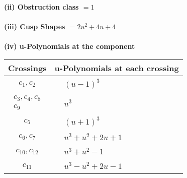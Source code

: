 \documentclass[1p]{elsarticle_modified}
\theoremstyle{definition}
\begin{document}
\flushleft \textbf{(ii) Obstruction class $= 1$}\\~\\
\flushleft \textbf{(iii) Cusp Shapes $= 2 u^2+4 u+4$}\\~\\
\newpage\renewcommand{\arraystretch}{1}
\flushleft \textbf{(iv) u-Polynomials at the component}\newline \\
\begin{tabular}{m{50pt}|m{274pt}}
Crossings & \hspace{64pt}u-Polynomials at each crossing \\
\hline $$\begin{aligned}c_{1},c_{2}\end{aligned}$$&$\begin{aligned}
&(u-1)^3
\end{aligned}$\\
\hline $$\begin{aligned}c_{3},c_{4},c_{8}\\c_{9}\end{aligned}$$&$\begin{aligned}
&u^3
\end{aligned}$\\
\hline $$\begin{aligned}c_{5}\end{aligned}$$&$\begin{aligned}
&(u+1)^3
\end{aligned}$\\
\hline $$\begin{aligned}c_{6},c_{7}\end{aligned}$$&$\begin{aligned}
&u^3+u^2+2 u+1
\end{aligned}$\\
\hline $$\begin{aligned}c_{10},c_{12}\end{aligned}$$&$\begin{aligned}
&u^3+u^2-1
\end{aligned}$\\
\hline $$\begin{aligned}c_{11}\end{aligned}$$&$\begin{aligned}
&u^3- u^2+2 u-1
\end{aligned}$\\
\hline
\end{tabular}\\~\\
\end{document}
